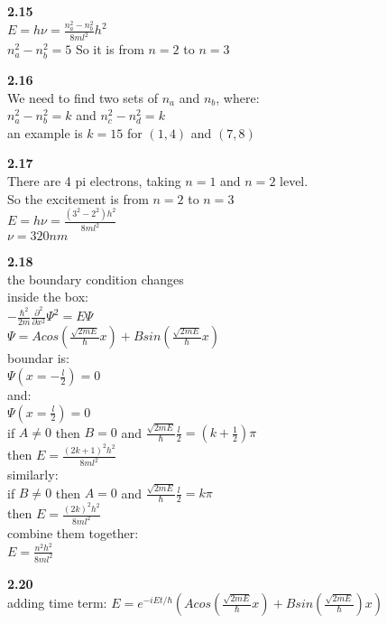 \documentclass{article}
\begin{document}
\textbf{2.15}\\
$E = h\nu = \frac{n_a^2 - n_b^2}{8ml^2}h^2$\\
$n_a^2 - n_b^2 = 5$
So it is from $n = 2$ to $n = 3$\\
\newline

\textbf{2.16}\\
We need to find two sets of $n_a$ and $n_b$, where:\\
$n_a^2 - n_b^2 = k$ and $n_c^2 - n_d^2 = k$\\
an example is $k = 15$ for $(1,4)$ and $(7, 8)$\\
\newline

\textbf{2.17}\\
There are 4 pi electrons, taking $n=1$ and $n=2$ level.\\
So the excitement is from $n = 2$ to $n = 3$\\
$E = h\nu = \frac{(3^2-2^2)h^2}{8ml^2}$\\
$\nu = 320nm$\\
\newline

\textbf{2.18}\\
the boundary condition changes\\
inside the box:\\
$-\frac{\hbar^2}{2m}\frac{\partial^2}{\partial x^2}\Psi^2 = E\Psi$\\
$\Psi = Acos(\frac{\sqrt{2mE}}{\hbar}x) + Bsin(\frac{\sqrt{2mE}}{\hbar}x)$\\
boundar is:\\
$\Psi(x = -\frac{l}{2}) = 0$\\
and:\\
$\Psi(x = \frac{l}{2}) = 0$\\
if $A \neq 0$ then $B = 0$ and $\frac{\sqrt{2mE}}{\hbar}\frac{l}{2} = (k+\frac{1}{2})\pi$\\
then $E = \frac{(2k+1)^2h^2}{8ml^2}$\\
similarly:\\
if $B \neq 0$ then $A = 0$ and $\frac{\sqrt{2mE}}{\hbar}\frac{l}{2} = k\pi$\\
then $E = \frac{(2k)^2h^2}{8ml^2}$\\
combine them together:\\
$E = \frac{n^2h^2}{8ml^2}$\\
\newline

\textbf{2.20}\\
adding time term:
$E = e^{-iEt/\hbar}(Acos(\frac{\sqrt{2mE}}{\hbar}x) + Bsin(\frac{\sqrt{2mE}}{\hbar})x)$\\
\newline
\end{document}
